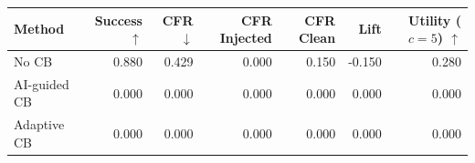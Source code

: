 \begin{tabular}{lrrrrrr}
\toprule
Method & Success $\uparrow$ & CFR $\downarrow$ & CFR Injected & CFR Clean & Lift & Utility ($c=5$) $\uparrow$ \\
\midrule
No CB & 0.880 & 0.429 & 0.000 & 0.150 & -0.150 & 0.280 \\
AI-guided CB & 0.000 & 0.000 & 0.000 & 0.000 & 0.000 & 0.000 \\
Adaptive CB & 0.000 & 0.000 & 0.000 & 0.000 & 0.000 & 0.000 \\
\bottomrule
\end{tabular}
